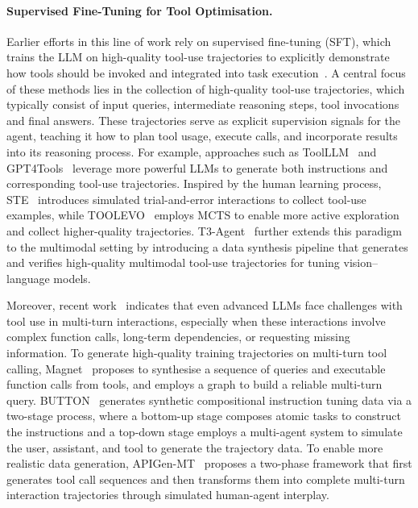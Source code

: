 \documentclass[]{selfevolagent}
\theoremstyle{plain}
\theoremstyle{definition}
\theoremstyle{remark}
\begin{document}
\paragraph{{Supervised Fine-Tuning for Tool Optimisation.}}
Earlier efforts in this line of work rely on supervised fine-tuning (SFT), which trains the LLM on high-quality tool-use trajectories to explicitly demonstrate how tools should be invoked and integrated into task execution~\citep{schick2023toolformer,du2024anytool,liu2025toolace,wang2025toolgen}. A central focus of these methods lies in the collection of high-quality tool-use trajectories, which typically consist of input queries, intermediate reasoning steps, tool invocations and final answers. These trajectories serve as explicit supervision signals for the agent, teaching it how to plan tool usage, execute calls, and incorporate results into its reasoning process. For example, approaches such as ToolLLM~\citep{qin2024toolllm} and GPT4Tools~\citep{yang2023gpt4tools} leverage more powerful LLMs to generate both instructions and corresponding tool-use trajectories. Inspired by the human learning process, STE~\citep{wang2024llms} introduces simulated trial-and-error interactions to collect tool-use examples, while TOOLEVO~\citep{chenlearning} employs MCTS to enable more active exploration and collect higher-quality trajectories. T3-Agent~\citep{gao2025multi} further extends this paradigm to the multimodal setting by introducing a data synthesis pipeline that generates and verifies high-quality multimodal tool-use trajectories for tuning vision–language models. 

Moreover, recent work~\citep{yao2025taubench} indicates that even advanced LLMs face challenges with tool use in multi-turn interactions, especially when these interactions involve complex function calls, long-term dependencies, or requesting missing information. To generate high-quality training trajectories on multi-turn tool calling, Magnet~\citep{yin2025magnet} proposes to synthesise a sequence of queries and executable function calls from tools, and employs a graph to build a reliable multi-turn query. BUTTON~\citep{chen2025facilitating} generates synthetic compositional instruction tuning data via a two-stage process, where a bottom-up stage composes atomic tasks to construct the instructions and a top-down stage employs a multi-agent system to simulate the user, assistant, and tool to generate the trajectory data. 
To enable more realistic data generation, APIGen-MT~\citep{prabhakar2025apigen} proposes a two-phase framework that first generates tool call sequences and then transforms them into complete multi-turn interaction trajectories through simulated human-agent interplay. 
\end{document}
